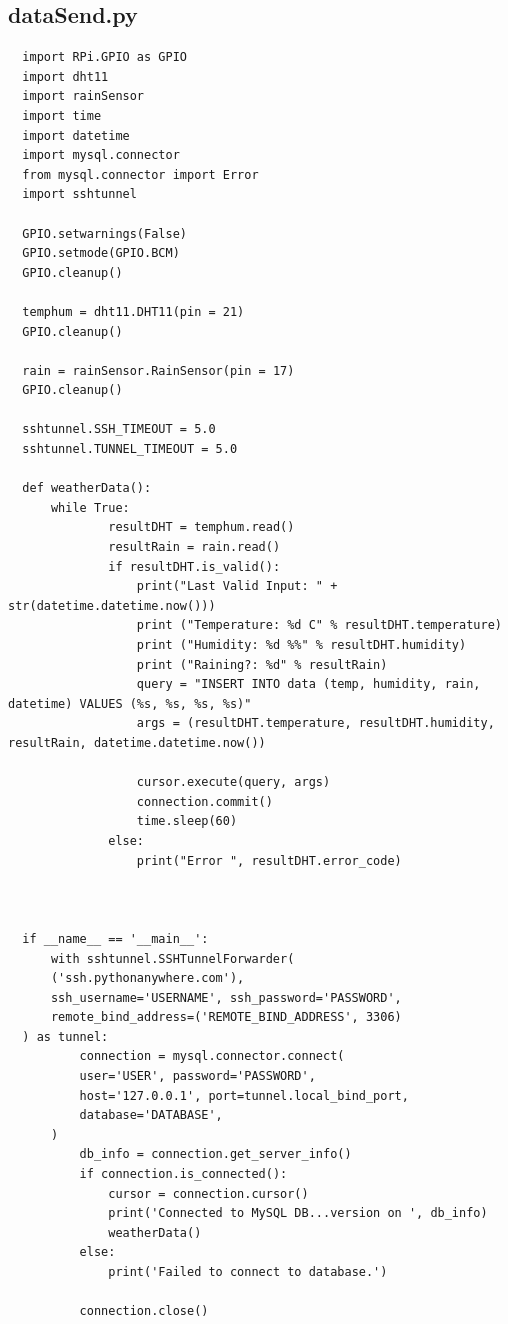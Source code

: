 \documentclass[10pt,a4paper]{article}
\begin{document}
\subsection{dataSend.py}
\begin{verbatim}
  import RPi.GPIO as GPIO
  import dht11
  import rainSensor
  import time
  import datetime
  import mysql.connector
  from mysql.connector import Error
  import sshtunnel

  GPIO.setwarnings(False)
  GPIO.setmode(GPIO.BCM)
  GPIO.cleanup()

  temphum = dht11.DHT11(pin = 21)
  GPIO.cleanup()

  rain = rainSensor.RainSensor(pin = 17)
  GPIO.cleanup()

  sshtunnel.SSH_TIMEOUT = 5.0
  sshtunnel.TUNNEL_TIMEOUT = 5.0

  def weatherData():
      while True:
              resultDHT = temphum.read()
              resultRain = rain.read()
              if resultDHT.is_valid():
                  print("Last Valid Input: " + str(datetime.datetime.now()))
                  print ("Temperature: %d C" % resultDHT.temperature)
                  print ("Humidity: %d %%" % resultDHT.humidity)
                  print ("Raining?: %d" % resultRain)
                  query = "INSERT INTO data (temp, humidity, rain, datetime) VALUES (%s, %s, %s, %s)"
                  args = (resultDHT.temperature, resultDHT.humidity, resultRain, datetime.datetime.now())

                  cursor.execute(query, args)
                  connection.commit()
                  time.sleep(60)
              else:
                  print("Error ", resultDHT.error_code)


  
  if __name__ == '__main__':
      with sshtunnel.SSHTunnelForwarder(
      ('ssh.pythonanywhere.com'),
      ssh_username='USERNAME', ssh_password='PASSWORD',
      remote_bind_address=('REMOTE_BIND_ADDRESS', 3306)
  ) as tunnel:
          connection = mysql.connector.connect(
          user='USER', password='PASSWORD',
          host='127.0.0.1', port=tunnel.local_bind_port,
          database='DATABASE',       
      )
          db_info = connection.get_server_info()
          if connection.is_connected():
              cursor = connection.cursor()
              print('Connected to MySQL DB...version on ', db_info)
              weatherData()
          else:
              print('Failed to connect to database.')
      
          connection.close()
\end{verbatim}
\end{document}
